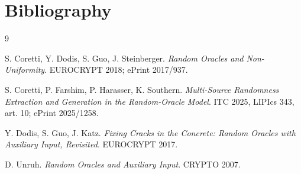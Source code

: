 \documentclass{conjura-conjecture}
\begin{document}
\section{Bibliography}

\begin{conjurabibliography}{9}

S. Coretti, Y. Dodis, S. Guo, J. Steinberger.
\emph{Random Oracles and Non-Uniformity}.
EUROCRYPT 2018; ePrint 2017/937.

S. Coretti, P. Farshim, P. Harasser, K. Southern.
\emph{Multi-Source Randomness Extraction and Generation in the
Random-Oracle Model}.
ITC 2025, LIPIcs 343, art. 10; ePrint 2025/1258.

Y. Dodis, S. Guo, J. Katz.
\emph{Fixing Cracks in the Concrete: Random Oracles with Auxiliary Input,
Revisited}.
EUROCRYPT 2017.

D. Unruh.
\emph{Random Oracles and Auxiliary Input}.
CRYPTO 2007.

\end{conjurabibliography}
\end{document}
